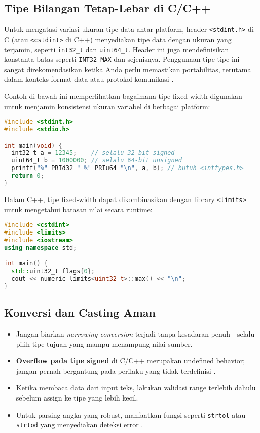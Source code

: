 \documentclass[../main.tex]{subfiles}
\begin{document}
\subsection{Tipe Bilangan Tetap-Lebar di C/C++}
Untuk mengatasi variasi ukuran tipe data antar platform, header \texttt{<stdint.h>} di C (atau \texttt{<cstdint>} di C++) menyediakan tipe data dengan ukuran yang terjamin, seperti \texttt{int32\_t} dan \texttt{uint64\_t}. Header ini juga mendefinisikan konstanta batas seperti \texttt{INT32\_MAX} dan sejenisnya. Penggunaan tipe-tipe ini sangat direkomendasikan ketika Anda perlu memastikan portabilitas, terutama dalam konteks format data atau protokol komunikasi \parencite{c-std-integer-types,cpp-numeric-limits}.

Contoh di bawah ini memperlihatkan bagaimana tipe fixed-width digunakan untuk menjamin konsistensi ukuran variabel di berbagai platform:

\begin{lstlisting}[language=C, caption={Contoh penggunaan <stdint.h> di C}]
#include <stdint.h>
#include <stdio.h>

int main(void) {
  int32_t a = 12345;    // selalu 32-bit signed
  uint64_t b = 1000000; // selalu 64-bit unsigned
  printf("%" PRId32 " %" PRIu64 "\n", a, b); // butuh <inttypes.h>
  return 0;
}
\end{lstlisting}

Dalam C++, tipe fixed-width dapat dikombinasikan dengan library \texttt{<limits>} untuk mengetahui batasan nilai secara runtime:

\begin{lstlisting}[language=C++, caption={Contoh penggunaan <cstdint> di C++}]
#include <cstdint>
#include <limits>
#include <iostream>
using namespace std;

int main() {
  std::uint32_t flags{0};
  cout << numeric_limits<uint32_t>::max() << "\n";
}
\end{lstlisting}

\subsection{Konversi dan Casting Aman}
\begin{itemize}
  \item Jangan biarkan \textit{narrowing conversion} terjadi tanpa kesadaran penuh—selalu pilih tipe tujuan yang mampu menampung nilai sumber.
  \item \textbf{Overflow pada tipe signed} di C/C++ merupakan undefined behavior; jangan pernah bergantung pada perilaku yang tidak terdefinisi \parencite{iso-c-draft-n1570,cpp-reference}.
  \item Ketika membaca data dari input teks, lakukan validasi range terlebih dahulu sebelum assign ke tipe yang lebih kecil.
  \item Untuk parsing angka yang robust, manfaatkan fungsi seperti \texttt{strtol} atau \texttt{strtod} yang menyediakan deteksi error \parencite{c-strtol}.
\end{itemize}
\end{document}
